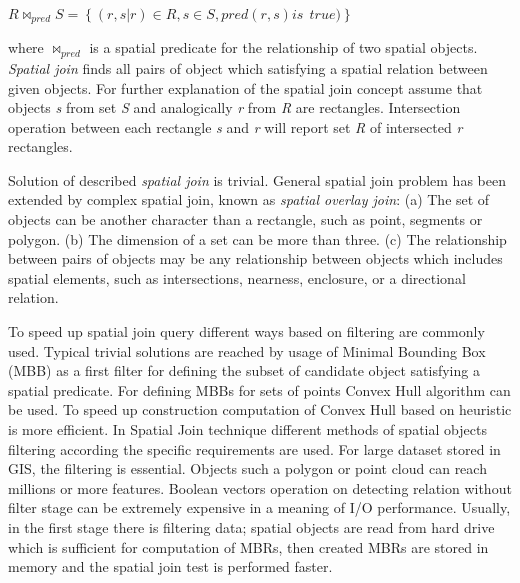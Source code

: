 \documentclass[a4paper,12pt,oneside]{report}
\begin{document}
	\begin{center}
		$R\bowtie_{pred}S=\left \{ \left ( r,s|r  \right )\in R,s \in S, pred(r,s) is \
		\ true) \right \}  $
	\end{center}
	where $\bowtie_{pred}$ is a spatial predicate for the relationship of two
	spatial objects. 
	\linebreak 
	\textit{Spatial join} finds all pairs of object which satisfying a spatial
	relation between given objects. 
	For further explanation of the spatial join concept assume that  objects
	\emph{s} from set \emph{S} and 
	analogically  \emph{r} from \emph{R} are rectangles. Intersection operation
	between each rectangle \emph{s} 
	and \emph{r} will report set \emph{R} of intersected \emph{r} rectangles.
	
	Solution of described \textit{spatial join} is trivial. General spatial join
	problem has been extended by 
	complex spatial join, known as \textit{spatial overlay join}\cite{spatial_join}:
	(a) The set of objects
	can be another character than a rectangle, such as point, segments or polygon.
	(b) The dimension of a set 
	can be more than three. (c) The relationship between pairs of objects may be any
	relationship between 
	objects which includes spatial elements, such as intersections, nearness,
	enclosure, or a directional relation. 

	To speed up spatial join query different ways based on filtering are commonly
	used.
	Typical trivial solutions are reached by usage of Minimal Bounding Box (MBB) as
	a first 
	filter for defining the subset of candidate object satisfying a spatial
	predicate. For defining MBBs for 
	sets of points Convex Hull algorithm can be used. 
	To speed up construction computation  of Convex Hull based on heuristic
	\cite{covex_hull} is more efficient. 
	In Spatial Join technique \cite{spatial_join}  different methods of  spatial
	objects filtering according the specific requirements are used. For large
	dataset stored in GIS, the filtering is essential. Objects such a polygon 
	or point cloud can reach millions or more features. Boolean vectors operation on
	detecting relation without filter stage 
	can be extremely expensive in a meaning of I/O performance. Usually, in the
	first stage there is filtering data; spatial objects 
	are read from hard drive which is sufficient for computation of MBRs, then
	created MBRs are 
	stored in memory and the spatial join test is performed faster.
	
	
\end{document}

